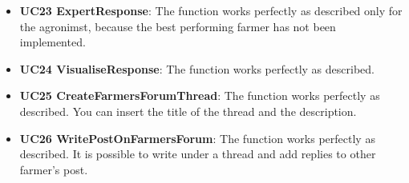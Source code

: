 \begin{itemize}
    \item \textbf{UC23 ExpertResponse}: The function works perfectly as described only for the agronimst, because the best performing farmer has not been implemented.
    \item \textbf{UC24 VisualiseResponse}: The function works perfectly as described.
    \item \textbf{UC25 CreateFarmersForumThread}: The function works perfectly as described. You can insert the title of the thread and the description.
    \item \textbf{UC26 WritePostOnFarmersForum}:  The function works perfectly as described. It is possible to write under a thread and add replies to other farmer's post.
\end{itemize}